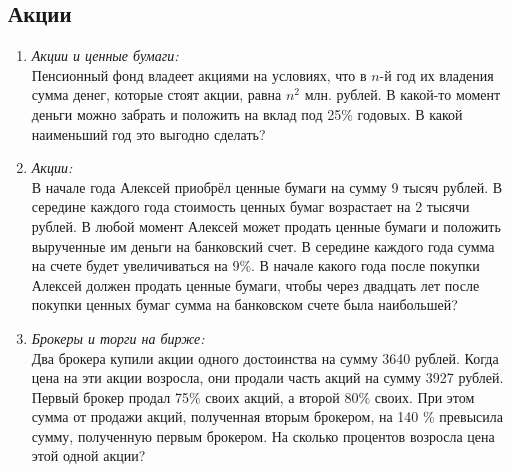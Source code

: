 \documentclass[12pt]{article}
\begin{document}
    \subsection{Акции}
    \begin{enumerate}[start=1,label={\itshape\bfseries \arabic*.}]
    \item \emph{Акции и ценные бумаги:}\\
    Пенсионный фонд владеет акциями на условиях, что в $n$-й год их владения сумма денег, которые стоят акции, равна $n^2$ млн. рублей. В какой-то момент деньги можно забрать и положить на вклад под 25$\%$ годовых. В какой наименьший год это выгодно сделать?
    \item \emph{Акции:}\\
    В начале года Алексей приобрёл ценные бумаги на сумму 9 тысяч рублей. В середине каждого года стоимость ценных бумаг возрастает на 2 тысячи рублей. В любой момент Алексей может продать ценные бумаги и положить вырученные им деньги на банковский счет. В середине каждого года сумма на счете будет увеличиваться на 9$\%$. В начале какого года после покупки Алексей должен продать ценные бумаги, чтобы через двадцать лет после покупки ценных бумаг сумма на банковском счете была наибольшей?
    \item \emph{Брокеры и торги на бирже:}\\
    Два брокера купили акции одного достоинства на сумму 3640 рублей. Когда цена на эти акции возросла, они продали часть акций на сумму 3927 рублей. Первый брокер продал 75$\%$ своих акций, а второй  80$\%$ своих. При этом сумма от продажи акций, полученная вторым брокером, на 140 $\%$ превысила сумму, полученную первым брокером. На сколько процентов возросла цена этой одной акции?
    \end{enumerate}
\end{document}
